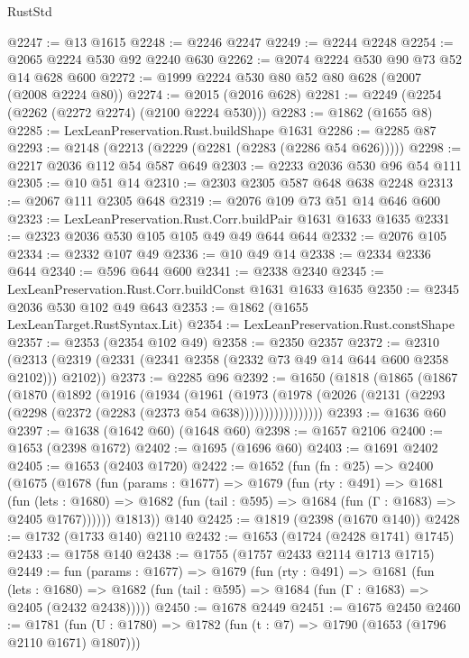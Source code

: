 \begin{lexlean}{RustStd}
\begin{coremodule}
@2247 := @13 @1615
@2248 := @2246 @2247
@2249 := @2244 @2248
@2254 := @2065 @2224 @530 @92 @2240 @630
@2262 := @2074 @2224 @530 @90 @73 @52 @14 @628 @600
@2272 := @1999 @2224 @530 @80 @52 @80 @628 (@2007 (@2008 @2224 @80))
@2274 := @2015 (@2016 @628)
@2281 := @2249 (@2254 (@2262 (@2272 @2274) (@2100 @2224 @530)))
@2283 := @1862 (@1655 @8)
@2285 := LexLeanPreservation.Rust.buildShape @1631
@2286 := @2285 @87
@2293 := @2148 (@2213 (@2229 (@2281 (@2283 (@2286 @54 @626)))))
@2298 := @2217 @2036 @112 @54 @587 @649
@2303 := @2233 @2036 @530 @96 @54 @111
@2305 := @10 @51 @14
@2310 := @2303 @2305 @587 @648 @638 @2248
@2313 := @2067 @111 @2305 @648
@2319 := @2076 @109 @73 @51 @14 @646 @600
@2323 := LexLeanPreservation.Rust.Corr.buildPair @1631 @1633 @1635
@2331 := @2323 @2036 @530 @105 @105 @49 @49 @644 @644
@2332 := @2076 @105
@2334 := @2332 @107 @49
@2336 := @10 @49 @14
@2338 := @2334 @2336 @644
@2340 := @596 @644 @600
@2341 := @2338 @2340
@2345 := LexLeanPreservation.Rust.Corr.buildConst @1631 @1633 @1635
@2350 := @2345 @2036 @530 @102 @49 @643
@2353 := @1862 (@1655 LexLeanTarget.RustSyntax.Lit)
@2354 := LexLeanPreservation.Rust.constShape
@2357 := @2353 (@2354 @102 @49)
@2358 := @2350 @2357
@2372 := @2310 (@2313 (@2319 (@2331 (@2341 @2358 (@2332 @73 @49 @14 @644 @600 @2358 @2102))) @2102))
@2373 := @2285 @96
@2392 := @1650
    (@1818
      (@1865
        (@1867
          (@1870
            (@1892
              (@1916
                (@1934
                  (@1961
                    (@1973
                      (@1978
                        (@2026 (@2131 (@2293 (@2298 (@2372 (@2283 (@2373 @54 @638)))))))))))))))))
@2393 := @1636 @60
@2397 := @1638 (@1642 @60) (@1648 @60)
@2398 := @1657 @2106
@2400 := @1653 (@2398 @1672)
@2402 := @1695 (@1696 @60)
@2403 := @1691 @2402
@2405 := @1653 (@2403 @1720)
@2422 := @1652
    (fun (fn : @25) =>
    @2400
      (@1675
        (@1678
          (fun (params : @1677) =>
          @1679
            (fun (rty : @491) =>
            @1681
              (fun (lets : @1680) =>
              @1682 (fun (tail : @595) => @1684 (fun (Γ : @1683) => @2405 @1767))))))
        @1813))
    @140
@2425 := @1819 (@2398 (@1670 @140))
@2428 := @1732 (@1733 @140) @2110
@2432 := @1653 (@1724 (@2428 @1741) @1745)
@2433 := @1758 @140
@2438 := @1755 (@1757 @2433 @2114 @1713 @1715)
@2449 := fun (params : @1677) =>
  @1679
    (fun (rty : @491) =>
    @1681
      (fun (lets : @1680) =>
      @1682 (fun (tail : @595) => @1684 (fun (Γ : @1683) => @2405 (@2432 @2438)))))
@2450 := @1678 @2449
@2451 := @1675 @2450
@2460 := @1781 (fun (U : @1780) => @1782 (fun (t : @7) => @1790 (@1653 (@1796 @2110 @1671) @1807)))

\end{coremodule}
\end{lexlean}
